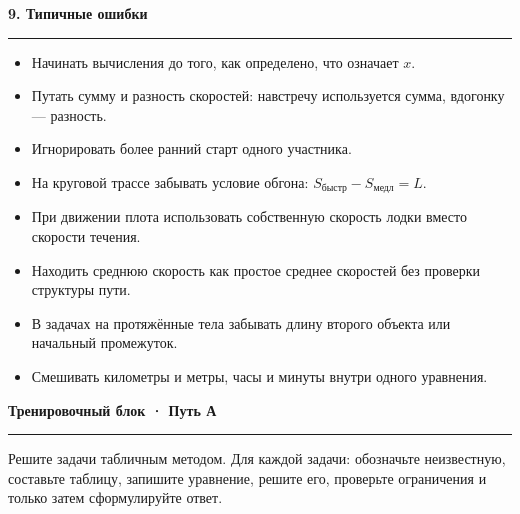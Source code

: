 \documentclass[a4paper,12pt]{article}
\newcommand{\sect}[1]{%
    \vspace{0.35em}%
    {\Large\bfseries\color{darkaccent}#1}\par
    \vspace{0.22em}%
    \color{linegray}\hrule
    \color{textgray}%
    \vspace{0.55em}%
}
\begin{document}
\sect{9. Типичные ошибки}

\begin{itemize}
    \item Начинать вычисления до того, как определено, что означает $x$.
    \item Путать сумму и разность скоростей: навстречу используется сумма, вдогонку --- разность.
    \item Игнорировать более ранний старт одного участника.
    \item На круговой трассе забывать условие обгона: $S_{\text{быстр}}-S_{\text{медл}}=L$.
    \item При движении плота использовать собственную скорость лодки вместо скорости течения.
    \item Находить среднюю скорость как простое среднее скоростей без проверки структуры пути.
    \item В задачах на протяжённые тела забывать длину второго объекта или начальный промежуток.
    \item Смешивать километры и метры, часы и минуты внутри одного уравнения.
\end{itemize}


\clearpage

\sect{Тренировочный блок · Путь А}

Решите задачи табличным методом. Для каждой задачи:
обозначьте неизвестную, составьте таблицу, запишите уравнение,
решите его, проверьте ограничения и только затем сформулируйте ответ.
\end{document}
